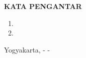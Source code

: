 {}

\begin{center}
	\textbf{KATA PENGANTAR}
\end{center}
\vspace{\baselineskip}

\begin{enumerate}
    \item 
    \item
\end{enumerate}

\begin{flushright}
    Yogyakarta, \hspace{20pt} -\hspace{20pt} - \the\year{}
    
    \vspace{3\baselineskip}
    
    \nama
\end{flushright}
 
